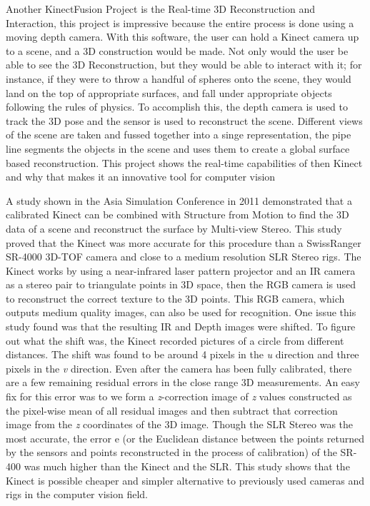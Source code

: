 \documentclass[pdftex,10.5pt]{report}
\begin{document}
Another KinectFusion Project is the Real-time 3D Reconstruction and Interaction, this project is impressive because the entire process is done using a moving depth camera. With this software, the user can hold a Kinect camera up to a scene, and a 3D construction would be made. Not only would the user be able to see the 3D Reconstruction, but they would be able to interact with it; for instance, if they were to throw a handful of spheres onto the scene, they would land on the top of appropriate surfaces, and fall under appropriate objects following the rules of physics. To accomplish this, the depth camera is used to track the 3D pose and the sensor is used to reconstruct the scene. Different views of the scene are taken and fussed together into a singe representation, the pipe line segments the objects in the scene and uses them to create a global surface based reconstruction. This project shows the real-time capabilities of then Kinect and why that makes it an innovative tool for computer vision

A study shown in the Asia Simulation Conference in 2011 demonstrated that a calibrated Kinect can be combined with Structure from Motion to find the 3D data of a scene and reconstruct the surface by Multi-view Stereo. This study proved that the Kinect was more accurate for this procedure than a SwissRanger SR-4000 3D-TOF camera and close to a medium resolution SLR Stereo rigs. The Kinect works by using a near-infrared laser pattern projector and an IR camera as a stereo pair to triangulate points in 3D space, then the RGB camera is used to reconstruct the correct texture to the 3D points. This RGB camera, which outputs medium quality images, can also be used for recognition. One issue this study found was that the resulting IR and Depth images were shifted. To figure out what the shift was, the Kinect recorded pictures of a circle from different distances. The shift was found to be around 4 pixels in the \emph{u} direction and three pixels in the \emph{v} direction. Even after the camera has been fully calibrated, there are a few remaining residual errors in the close range 3D measurements. An easy fix for this error was to we form a \emph{z}-correction image of \emph{z} values constructed as the pixel-wise mean of all residual images and then subtract that correction image from the \emph{z} coordinates of the 3D image.\cite{cite1} Though the SLR Stereo was the most accurate, the error e (or the Euclidean distance between the points returned by the sensors and points reconstructed in the process of calibration) of the SR-400 was much higher than the Kinect and the SLR. This study shows that the Kinect is possible cheaper and simpler alternative to previously used cameras and rigs in the computer vision field.
\end{document}
